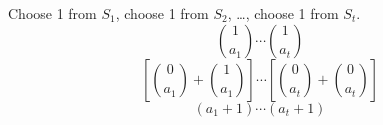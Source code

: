 \documentclass{article}
\theoremstyle{definition}
\begin{document}
Choose 1 from \(S_1\), choose 1 from \(S_2\), \dots, choose 1 from \(S_t\).
\[
  \binom{1}{a_1} \cdots \binom{1}{a_t}
\]
\[
  \left[\binom{0}{a_1} + \binom{1}{a_1} \right] \cdots \left[\binom{0}{a_t} + \binom{0}{a_t} \right]
\]
\[
  (a_1 + 1) \cdots (a_t + 1)
\]

\newpage


\end{document}
